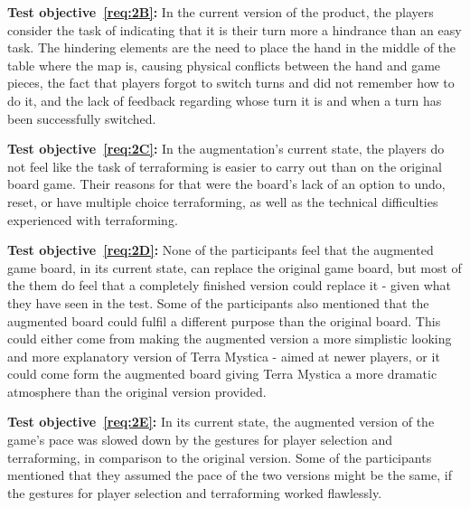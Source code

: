 \textbf{Test objective~\ref{req:2B}:} In the current version of the product, the players consider the task of indicating that it is their turn more a hindrance than an easy task. The hindering elements are the need to place the hand in the middle of the table where the map is, causing physical conflicts between the hand and game pieces, the fact that players forgot to switch turns and did not remember how to do it, and the lack of feedback regarding whose turn it is and when a turn has been successfully switched. 

\textbf{Test objective~\ref{req:2C}:} In the augmentation's current state, the players do not feel like the task of terraforming is easier to carry out than on the original board game. Their reasons for that were the board's lack of an option to undo, reset, or have multiple choice terraforming, as well as the technical difficulties experienced with terraforming. 

\textbf{Test objective~\ref{req:2D}:} None of the participants feel that the augmented game board, in its current state, can replace the original game board, but most of the them do feel that a completely finished version could replace it - given what they have seen in the test. Some of the participants also mentioned that the augmented board could fulfil a different purpose than the original board. This could either come from making the augmented version a more simplistic looking and more explanatory version of Terra Mystica - aimed at newer players, or it could come form the augmented board giving Terra Mystica a more dramatic atmosphere than the original version provided.

\textbf{Test objective~\ref{req:2E}:} In its current state, the augmented version of the game's pace was slowed down by the gestures for player selection and terraforming, in comparison to the original version. Some of the participants mentioned that they assumed the pace of the two versions might be the same, if the gestures for player selection and terraforming worked flawlessly. 